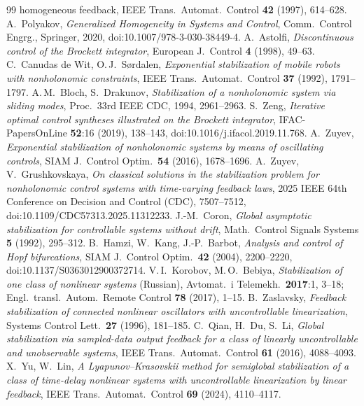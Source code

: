 \documentclass[11pt,reqno]{amsart}
\theoremstyle{plain}
\theoremstyle{remark}
\theoremstyle{definition}
\begin{document}
{\begin{thebibliography}{99}
{  homogeneous feedback}, IEEE Trans.\ Automat.\ Control \textbf{42} (1997), 614--628.
 A.~Polyakov,
  \emph{Generalized Homogeneity in Systems and Control}, Comm.\ Control Engrg., Springer, 2020,
  doi:10.1007/978-3-030-38449-4.
 A.~Astolfi,
  \emph{Discontinuous control of the Brockett integrator},
  European J.\ Control \textbf{4} (1998), 49--63.
 C.~Canudas de Wit, O.\,J.~S\o rdalen,
  \emph{Exponential stabilization of mobile robots with nonholonomic constraints},
  IEEE Trans.\ Automat.\ Control \textbf{37} (1992), 1791--1797.
 A.\,M.~Bloch, S.~Drakunov,
  \emph{Stabilization of a nonholonomic system via sliding modes},
  Proc.\ 33rd IEEE CDC, 1994, 2961--2963.
 S.~Zeng,
  \emph{Iterative optimal control syntheses illustrated on the Brockett integrator},
  IFAC-PapersOnLine \textbf{52}:16 (2019), 138--143, doi:10.1016/j.ifacol.2019.11.768.
 A.~Zuyev,
  \emph{Exponential stabilization of nonholonomic systems by means of oscillating controls},
  SIAM J.\ Control Optim.\ \textbf{54} (2016), 1678--1696.
 A.~Zuyev, V.~Grushkovskaya,
  \emph{On classical solutions in the stabilization problem for nonholonomic control systems with
  time-varying feedback laws}, 2025 IEEE 64th Conference on Decision and Control (CDC), 7507--7512,
  doi:10.1109/CDC57313.2025.11312233.
 J.-M.~Coron,
  \emph{Global asymptotic stabilization for controllable systems without drift},
  Math.\ Control Signals Systems \textbf{5} (1992), 295--312.
 B.~Hamzi, W.~Kang, J.-P.~Barbot,
  \emph{Analysis and control of Hopf bifurcations}, SIAM J.\ Control Optim.\ \textbf{42} (2004), 2200--2220,
  doi:10.1137/S0363012900372714.
 V.\,I.~Korobov, M.\,O.~Bebiya,
  \emph{Stabilization of one class of nonlinear systems} \textup{(Russian)},
  Avtomat.\ i Telemekh.\ \textbf{2017}:1, 3--18; Engl.\ transl.\ Autom.\ Remote
  Control \textbf{78} (2017), 1--15.
 B.~Zaslavsky,
  \emph{Feedback stabilization of connected nonlinear oscillators with
  uncontrollable linearization}, Systems Control Lett.\ \textbf{27} (1996), 181--185.
\enlargethispage{2\baselineskip} C.~Qian, H.~Du, S.~Li,
  \emph{Global stabilization via sampled-data output feedback for a class of linearly uncontrollable and
  unobservable systems}, IEEE Trans.\ Automat.\ Control \textbf{61} (2016), 4088--4093.
 X.~Yu, W.~Lin,
  \emph{A Lyapunov--Krasovskii method for semiglobal stabilization of a class of time-delay nonlinear systems
  with uncontrollable linearization by linear feedback}, IEEE Trans.\ Automat.\ Control \textbf{69} (2024),
  4110--4117.
\end{thebibliography}
}
\end{document}
